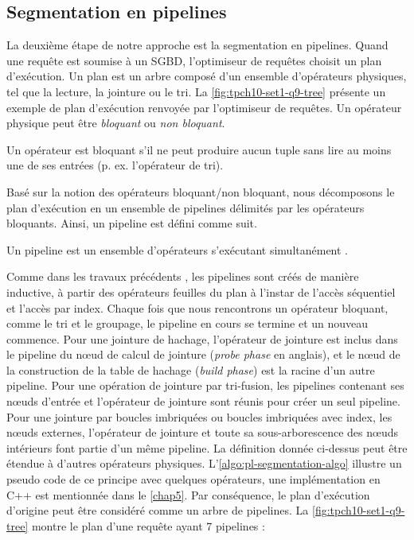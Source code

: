 \subsection{Segmentation en pipelines}
La deuxième étape de notre approche est la segmentation en pipelines. Quand une requête est soumise à un SGBD, l'optimiseur de requêtes choisit un plan d'exécution. Un plan est un arbre composé d'un ensemble d'opérateurs physiques, tel que la lecture, la jointure ou le tri. La \ref{fig:tpch10-set1-q9-tree} présente un exemple de plan d'exécution renvoyée par l'optimiseur de requêtes. Un opérateur physique peut être \textit{bloquant} ou \textit{non bloquant}.
\begin{definition}
Un opérateur est bloquant s'il ne peut produire aucun tuple sans lire au moins une de ses entrées (p. ex. l'opérateur de tri).
\end{definition}
Basé sur la notion des opérateurs bloquant/non bloquant, nous décomposons le plan d'exécution en un ensemble de pipelines délimités par les opérateurs bloquants. Ainsi, un pipeline est défini comme suit.
\begin{definition}
Un pipeline est un ensemble d'opérateurs s'exécutant simultanément \cite{li12}.
\end{definition}
Comme dans les travaux précédents \cite{chaudhuri04, luo04}, les pipelines sont créés de manière inductive, à partir des opérateurs feuilles du plan à l'instar de l'accès séquentiel et l'accès par index. Chaque fois que nous rencontrons un opérateur bloquant, comme le tri et le groupage, le pipeline en cours se termine et un nouveau commence. Pour une jointure de hachage, l'opérateur de jointure est inclus dans le pipeline du nœud de calcul de jointure (\textit{probe phase} en anglais), et le nœud de la construction de la table de hachage (\textit{build phase}) est la racine d'un autre pipeline. Pour une opération de jointure par tri-fusion, les pipelines contenant ses nœuds d'entrée et l'opérateur de jointure sont réunis pour créer un seul pipeline. Pour une jointure par boucles imbriquées ou boucles imbriquées avec index, les nœuds externes, l'opérateur de jointure et toute sa sous-arborescence des nœuds intérieurs font partie d'un même pipeline.
La définition donnée ci-dessus peut être étendue à d'autres opérateurs physiques. L'\ref{algo:pl-segmentation-algo} illustre un pseudo code de ce principe avec quelques opérateurs, une implémentation en C++ est mentionnée dans le \ref{chap5}. 
Par conséquence, le plan d'exécution d'origine peut être considéré comme un arbre de pipelines. La \ref{fig:tpch10-set1-q9-tree} montre le plan d'une requête ayant 7 pipelines :
